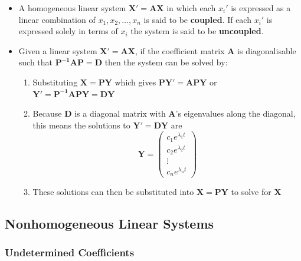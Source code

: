 \documentclass{article}
\begin{document}
\begin{itemize}
  \item A homogeneous linear system $\mathbf{X}' = \mathbf{A} \mathbf{X}$ in which each $x_i'$ is expressed as a linear combination of $x_1, x_2, \ldots, x_n$ is said to be \textbf{coupled}. If each $x_i'$ is expressed solely in terms of $x_i$ the system is said to be \textbf{uncoupled}.

  \item Given a linear system $\mathbf{X' = A X}$, if the coefficient matrix $\mathbf{A}$ is diagonalisable such that $\mathbf{P^{-1} A P = D}$ then the system can be solved by:

        \begin{enumerate}
          \item Substituting $\mathbf{X = P Y}$ which gives $\mathbf{P Y' = A P Y}$ or \\ $\mathbf{Y' = P^{-1} A P Y = D Y}$

          \item Because $\mathbf{D}$ is a diagonal matrix with $\mathbf{A}$'s eigenvalues along the diagonal, this means the solutions to $\mathbf{Y' = D Y}$ are \[\mathbf{Y} = \begin{pmatrix}
                    c_1 e^{\lambda_1 t} \\
                    c_2 e^{\lambda_2 t} \\
                    \vdots              \\
                    c_n e^{\lambda_n t}
                  \end{pmatrix}\]

          \item These solutions can then be substituted into $\mathbf{X = P Y}$ to solve for $\mathbf{X}$
        \end{enumerate}
\end{itemize}

\subsection{Nonhomogeneous Linear Systems}

\subsubsection{Undetermined Coefficients}
\end{document}

